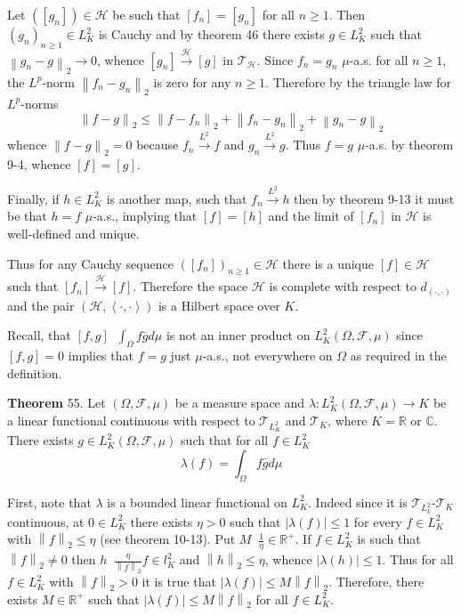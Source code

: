 \documentclass[a4paper]{article}
\newcommand{\clo}[1]{\left [ #1 \right ]}
\newcommand{\brac}[1]{\left ( #1 \right )}
\newcommand{\abs}[1]{\left | #1 \right |}
\newcommand{\nrm}[1]{\left\| #1 \right \|}
\newcommand{\brkt}[1]{\left\langle #1 \right\rangle}
\newcommand{\Real}{\mathbb{R}}
\newcommand{\Cplx}{\mathbb{C}}
\newcommand{\Tcal}{\mathcal{T}}
\newcommand{\Hcal}{\mathcal{H}}
\newcommand{\Fcal}{\mathcal{F}}
\newcommand{\defn}{\mathop{\overset{\Delta}{=}}\nolimits}
\begin{document}
Let $\brac{\clo{g_n}}\in\Hcal$ be such that $\clo{f_n}=\clo{g_n}$ for all $n\geq 1$. Then $\brac{g_n}_{n\geq 1} \in L^2_K$ is Cauchy and by theorem 46 there exists $g\in L^2_K$ such that $\nrm{g_n-g}_2\to 0$, whence $\clo{g_n}\overset{\Hcal}{\to}\clo{g}$ in $\Tcal_\Hcal$. Since $f_n=g_n$ $\mu$-a.s. for all $n\geq 1$, the $L^p$-norm $\nrm{f_n-g_n}_2$ is zero for any $n\geq 1$. Therefore by the triangle law for $L^p$-norms \[\nrm{f-g}_2\leq \nrm{f-f_n}_2+\nrm{f_n-g_n}_2+\nrm{g_n-g}_2\] whence $\nrm{f-g}_2=0$ because $f_n\overset{L^2}{\to}f$ and $g_n\overset{L^2}{\to}g$. Thus $f=g$ $\mu$-a.s. by theorem 9-4, whence $\clo{f}=\clo{g}$.

Finally, if $h\in L^2_K$ is another map, such that $f_n\overset{L^2}{\to}h$ then by theorem 9-13 it must be that $h=f$ $\mu$-a.s., implying that $\clo{f}=\clo{h}$ and the limit of $\clo{f_n}$ in $\Hcal$ is well-defined and unique.

Thus for any Cauchy sequence $\brac{\clo{f_n}}_{n\geq1}\in\Hcal$ there is a unique $\clo{f}\in \Hcal$ such that $\clo{f_n}\overset{\Hcal}{\to}\clo{f}$. Therefore the space $\Hcal$ is complete with respect to $d_{\brac{\cdot,\cdot}}$ and the pair $\brac{\Hcal, \brkt{\cdot,\cdot}}$ is a Hilbert space over $K$.

Recall, that $\clo{f,g}\defn \int_\Omega f\bar{g}d\mu$ is not an inner product on $L^2_K\brac{\Omega, \Fcal, \mu}$ since $\clo{f,g}=0$ implies that $f=g$ just $\mu$-a.s., not everywhere on $\Omega$ as required in the definition.

\label{thm:lin_func_cplx_int} \noindent \textbf{Theorem} 55.
Let $\brac{\Omega, \Fcal, \mu}$ be a measure space and $\lambda:L^2_K\brac{\Omega, \Fcal, \mu}\to K$ be a linear functional continuous with respect to $\Tcal_{L^2_K}$ and $\Tcal_K$, where $K=\Real$ or $\Cplx$. There exists $g\in L^2_K\brac{\Omega, \Fcal, \mu}$ such that for all $f\in L^2_K$ \[\lambda\brac{f} = \int_\Omega f\bar{g} d\mu\]

First, note that $\lambda$ is a bounded linear functional on $L^2_K$. Indeed since it is $\Tcal_{L^2_k}$-$\Tcal_K$ continuous, at $0\in L^2_K$ there exists $\eta>0$ such that $\abs{\lambda\brac{f}}\leq 1$ for every $f\in L^2_K$ with $\nrm{f}_2\leq\eta$ (see theorem 10-13). Put $M\defn \frac{1}{\eta}\in \Real^+$. If $f\in L^2_K$ is such that $\nrm{f}_2\neq 0$ then $h\defn\frac{\eta}{\nrm{f}_2}f\in l^2_K$ and $\nrm{h}_2\leq \eta$, whence $\abs{\lambda\brac{h}}\leq 1$. Thus for all $f\in L^2_K$ with $\nrm{f}_2>0$ it is true that $\abs{\lambda\brac{f}}\leq M\nrm{f}_2$. Therefore, there exists $M\in \Real^+$ such that $\abs{\lambda\brac{f}}\leq M\nrm{f}_2$ for all $f\in L^2_K$.
\end{document}
